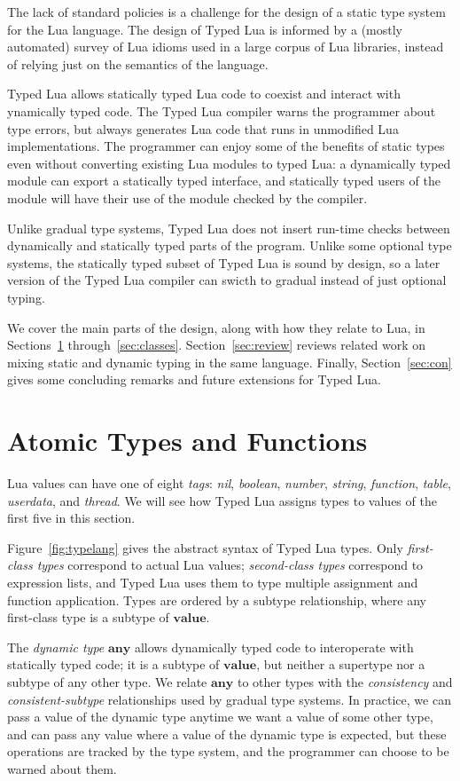 \documentclass[preprint]{sig-alternate}
\newcommand{\Any}{\mathbf{any}}
\newcommand{\Top}{\mathbf{value}}
\begin{document}
The lack of standard policies
is a challenge for the design of a static type system for the Lua
language. The design of Typed Lua is informed by a (mostly
automated) survey of Lua idioms used in a large corpus of Lua
libraries, instead of relying just on the semantics of the
language.

Typed Lua allows statically typed Lua code to coexist and
interact with  ynamically typed code. The Typed Lua compiler
warns the programmer about type errors, but always generates
Lua code that runs in unmodified Lua implementations. The
programmer can enjoy some of the benefits of static types even
without converting existing Lua modules to typed Lua:
a dynamically typed module can export a statically typed
interface, and statically typed users of the module will have
their use of the module checked by the compiler.

Unlike gradual type systems, Typed Lua does not insert run-time
checks between dynamically and statically typed parts of the
program. Unlike some optional type systems, the statically
typed subset of Typed Lua is sound by design, so a later
version of the Typed Lua compiler can swicth to gradual
instead of just optional typing.

We cover the main parts of the design, along with
how they relate to Lua, in Sections~\ref{sec:atomic}
through~\ref{sec:classes}. Section~\ref{sec:review} reviews
related work on mixing static and dynamic typing in the same
language. Finally, Section~\ref{sec:con} gives some
concluding remarks and future extensions for Typed Lua.

\section{Atomic Types and Functions}
\label{sec:atomic}

Lua values can have one of eight {\em tags}: {\em nil}, {\em boolean},
{\em number}, {\em string}, {\em function}, {\em table}, {\em userdata},
and {\em thread}. We will see how Typed Lua assigns types to
values of the first five in this section.

Figure~\ref{fig:typelang} gives the abstract syntax of Typed Lua
types. Only {\em first-class types} correspond to actual Lua
values; {\em second-class types} correspond to expression lists,
and Typed Lua uses them to type multiple assignment and function
application. Types are ordered by a subtype relationship, where
any first-class type is a subtype of $\Top$.

The {\em dynamic type} $\Any$ allows dynamically typed code to
interoperate with statically typed code; it is a subtype of $\Top$, but
neither a supertype nor a subtype of any other type. We relate $\Any$
to other types with the {\em consistency} and {\em consistent-subtype}
relationships used by gradual type systems. In practice, we can
pass a value of the dynamic type anytime we want a value of some
other type, and can pass any value where a value of the dynamic type
is expected, but these operations are tracked by the type system,
and the programmer can choose to be warned about them.
\end{document}
